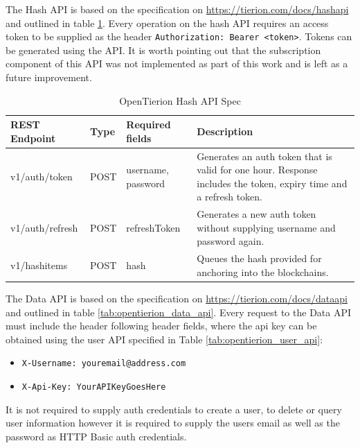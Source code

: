 \documentclass[12pt,msc,a4paper,oneside]{ucl_thesis}
\begin{document}
The Hash API is based on the specification on \url{https://tierion.com/docs/hashapi} and outlined in table \ref{tab:opentierion_hash_api}. Every operation on the hash API requires an access token to be supplied as the header \texttt{Authorization: Bearer <token>}. Tokens can be generated using the API. It is worth pointing out that the subscription component of this API was not implemented as part of this work and is left as a future improvement.
\begin{table}[!htbp]
    \begin{tabularx}{\textwidth}{| l l l X |}
        \hline
        \textbf{REST Endpoint} & \textbf{Type} & \textbf{Required fields} & \textbf{Description} \\
        \hline
        v1/auth/token & POST & username, password & Generates an auth token that is valid for one hour. Response includes the token, expiry time and a refresh token. \\

        v1/auth/refresh & POST & refreshToken & Generates a new auth token without supplying username and password again. \\

        v1/hashitems & POST & hash & Queues the hash provided for anchoring into the blockchains. \\
        \hline
    \end{tabularx}
    \caption{OpenTierion Hash API Spec}
    \label{tab:opentierion_hash_api}
\end{table}

The Data API is based on the specification on \url{https://tierion.com/docs/dataapi} and outlined in table \ref{tab:opentierion_data_api}. Every request to the Data API must include the header following header fields, where the api key can be obtained using the user API specified in Table \ref{tab:opentierion_user_api}:
\begin{itemize}
    \item\texttt{X-Username: youremail@address.com}
    \item\texttt{X-Api-Key: YourAPIKeyGoesHere}
\end{itemize}
It is not required to supply auth credentials to create a user, to delete or query user information however it is required to supply the users email as well as the password as HTTP Basic auth credentials.
\end{document}
